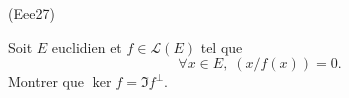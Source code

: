 \begin{tiny}(Eee27)\end{tiny} Soit $E$ euclidien et $f\in \mathcal{L}(E)$ tel que
\[
 \forall x \in E, \; (x / f(x)) = 0.
\]
Montrer que $\ker f = \Im f^\bot$.